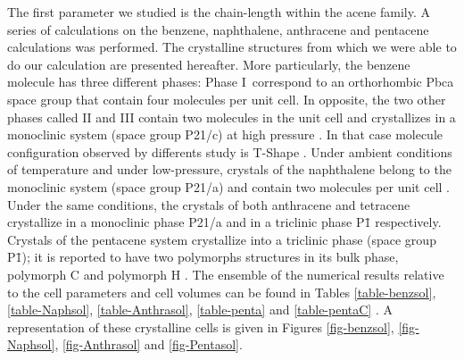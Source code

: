  The first parameter we studied is the chain-length within the acene family. A series of calculations on the benzene, naphthalene, anthracene and pentacene calculations was performed. The crystalline structures from which we were able to do our calculation are presented hereafter. More particularly, the benzene molecule has three different phases: Phase I correspond to an orthorhombic Pbca space group that contain four molecules per unit cell. In opposite, the two other phases called II and III contain two molecules in the unit cell and crystallizes in a monoclinic system (space group P21/c) at high pressure \cite{meijer1996density,katrusiak2010association}. In that case molecule configuration observed by differents study is T-Shape \cite{katrusiak2010association}. Under ambient conditions of temperature and under low-pressure, crystals of the naphthalene belong to the monoclinic system (space group P21/a) and contain two molecules per unit cell \cite{fabbiani2006exploration}. Under the same conditions, the crystals of both anthracene and tetracene crystallize in a monoclinic phase P21/a \cite{brock1990temperature} and in a triclinic phase P\={1} \cite{sondermann1985x} respectively. Crystals of the pentacene system crystallize into a triclinic phase (space group P\={1}); it is reported to have two polymorphs structures in its bulk phase, polymorph C \cite{campbell1962crystal} and polymorph H \cite{mattheus2001polymorphism}. The ensemble of the numerical results relative to the cell parameters and cell volumes can be found in Tables \ref{table-benzsol}, \ref{table-Naphsol}, \ref{table-Anthrasol}, \ref{table-penta} and \ref{table-pentaC} . A representation of these crystalline cells is given in Figures \ref{fig-benzsol}, \ref{fig-Naphsol}, \ref{fig-Anthrasol} and  \ref{fig-Pentasol}.
 
